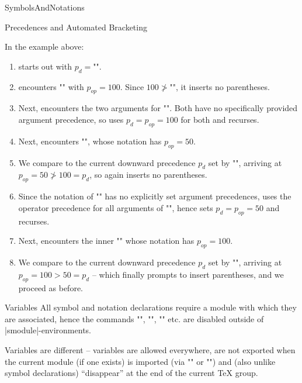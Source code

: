 \begin{smodule}[ns=https://github.com/slatex/sTeX/doc]{SymbolsAndNotations}
\begin{sfragment}{Precedences and Automated Bracketing}
\begin{dangerbox}
        In the example above: 
        \begin{enumerate}
            \item \sTeX starts out with $p_d=$\stexcode"\infprec".
            \item \sTeX encounters \stexcode"\addition"
                with $p_{op}=100$. Since $100\not>$\stexcode"\infprec",
                it inserts no parentheses.
            \item Next, \sTeX encounters the two arguments for \stexcode"\addition".
                Both have no specifically provided argument precedence,
                so \sTeX uses $p_d=p_{op}=100$ for both and recurses.
            \item Next, \sTeX encounters 
                \stexcode"", whose notation has 
                $p_{op}=50$.
            \item We compare to the current
                downward precedence $p_d$ set by \stexcode"\addition",
                arriving at $p_{op}=50\not>100=p_d$, so \sTeX again inserts
                no parentheses.
            \item Since the notation of \stexcode"\multiplication" 
                has no explicitly set argument precedences,
                \sTeX uses the operator precedence for all
                arguments of \stexcode"\multiplication",
                hence sets $p_d=p_{op}=50$ and recurses.
            \item Next, \sTeX encounters the inner 
                \stexcode"" whose notation has 
                $p_{op}=100$.
            \item We compare to the current downward 
                precedence $p_d$ set by \stexcode"\multiplication",
                arriving at $p_{op}=100>50=p_d$ -- 
                which finally prompts \sTeX to insert parentheses, 
                and we proceed as before.
        \end{enumerate}
    \end{dangerbox}


\end{sfragment}

\begin{sfragment}{Variables}
    All symbol and notation declarations require a module
    with which they are associated, hence the commands
    \stexcode"\symdecl", \stexcode"\notation", \stexcode"\symdef"
    etc. are disabled outside of |smodule|-environments.

    Variables are different -- variables are allowed everywhere,
    are not exported when the current module (if one exists)
    is imported (via \stexcode"\importmodule" or \stexcode"\usemodule")
    and (also unlike symbol declarations) ``disappear'' at the
    end of the current \TeX\xspace group.


\end{sfragment}
\end{smodule}
